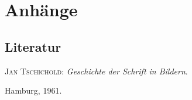 \part{Anhänge}
\printglossaries

\chapter{Literatur}
\label{sec:Literatur}
\textsc{Jan Tschichold}:\textit{ Geschichte der Schrift in
  Bildern}.\par \hspace{9.0 pt} Hamburg, 1961.


